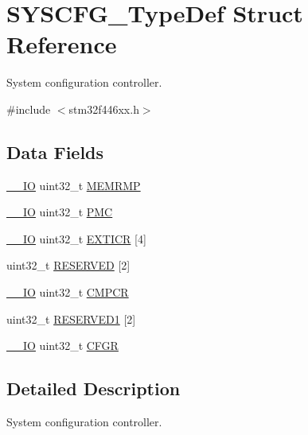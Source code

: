 \hypertarget{struct_s_y_s_c_f_g___type_def}{}\section{S\+Y\+S\+C\+F\+G\+\_\+\+Type\+Def Struct Reference}
\label{struct_s_y_s_c_f_g___type_def}


System configuration controller.  




{\ttfamily \#include $<$stm32f446xx.\+h$>$}

\subsection*{Data Fields}
\begin{DoxyCompactItemize}
\item 
\mbox{\hyperlink{core__sc300_8h_aec43007d9998a0a0e01faede4133d6be}{\+\_\+\+\_\+\+IO}} uint32\+\_\+t \mbox{\hyperlink{struct_s_y_s_c_f_g___type_def_ab36c409d0a009e3ce5a89ac55d3ff194}{M\+E\+M\+R\+MP}}
\item 
\mbox{\hyperlink{core__sc300_8h_aec43007d9998a0a0e01faede4133d6be}{\+\_\+\+\_\+\+IO}} uint32\+\_\+t \mbox{\hyperlink{struct_s_y_s_c_f_g___type_def_a2130abf1fefb63ce4c4b138fd8c9822a}{P\+MC}}
\item 
\mbox{\hyperlink{core__sc300_8h_aec43007d9998a0a0e01faede4133d6be}{\+\_\+\+\_\+\+IO}} uint32\+\_\+t \mbox{\hyperlink{struct_s_y_s_c_f_g___type_def_a52f7bf8003ba69d66a4e86dea6eeab65}{E\+X\+T\+I\+CR}} \mbox{[}4\mbox{]}
\item 
uint32\+\_\+t \mbox{\hyperlink{struct_s_y_s_c_f_g___type_def_afaf27b66c1edc60064db3fa6e693fb59}{R\+E\+S\+E\+R\+V\+ED}} \mbox{[}2\mbox{]}
\item 
\mbox{\hyperlink{core__sc300_8h_aec43007d9998a0a0e01faede4133d6be}{\+\_\+\+\_\+\+IO}} uint32\+\_\+t \mbox{\hyperlink{struct_s_y_s_c_f_g___type_def_a08ddbac546fa9928256654d31255c8c3}{C\+M\+P\+CR}}
\item 
uint32\+\_\+t \mbox{\hyperlink{struct_s_y_s_c_f_g___type_def_a28d88d9a08aab1adbebea61c42ef901e}{R\+E\+S\+E\+R\+V\+E\+D1}} \mbox{[}2\mbox{]}
\item 
\mbox{\hyperlink{core__sc300_8h_aec43007d9998a0a0e01faede4133d6be}{\+\_\+\+\_\+\+IO}} uint32\+\_\+t \mbox{\hyperlink{struct_s_y_s_c_f_g___type_def_a26f1e746ccbf9c9f67e7c60e61085ec1}{C\+F\+GR}}
\end{DoxyCompactItemize}


\subsection{Detailed Description}
System configuration controller. 

